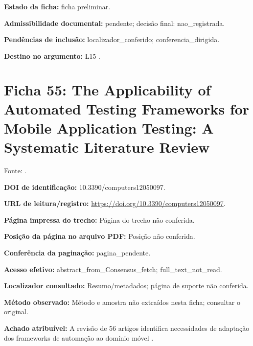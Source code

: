 \noindent\textbf{Estado da ficha:} ficha preliminar.\par\medskip

\noindent\textbf{Admissibilidade documental:} pendente; decisão final: nao\_registrada.\par\medskip

\noindent\textbf{Pendências de inclusão:} localizador\_conferido; conferencia\_dirigida.\par\medskip

\noindent\textbf{Destino no argumento:} L15 .

\clearpage\section*{Ficha 55: The Applicability of Automated Testing Frameworks for Mobile Application Testing: A Systematic Literature Review}

Fonte: \citet{eng02}.

\noindent\textbf{DOI de identificação:} 10.3390/computers12050097.\par\medskip

\noindent\textbf{URL de leitura/registro:} \url{https://doi.org/10.3390/computers12050097}.\par\medskip

\noindent\textbf{Página impressa do trecho:} Página do trecho não conferida.\par\medskip

\noindent\textbf{Posição da página no arquivo PDF:} Posição não conferida.\par\medskip

\noindent\textbf{Conferência da paginação:} pagina\_pendente.\par\medskip

\noindent\textbf{Acesso efetivo:} abstract\_from\_Consensus\_fetch; full\_text\_not\_read.\par\medskip

\noindent\textbf{Localizador consultado:} Resumo/metadados; página de suporte não conferida.\par\medskip

\noindent\textbf{Método observado:} Método e amostra não extraídos nesta ficha; consultar o original.\par\medskip

\noindent\textbf{Achado atribuível:} A revisão de 56 artigos identifica necessidades de adaptação dos frameworks de automação ao domínio móvel \citep{eng02}.\par\medskip

